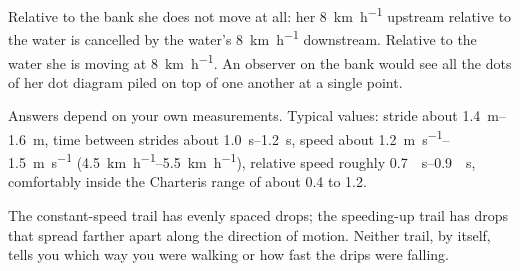 \documentclass[11pt,twoside,openany]{book}
\begin{document}
\begin{description}[leftmargin=2.6em,itemsep=3pt,style=sameline]
  \item[1.38] Relative to the bank she does not move at all: her \SI{8}{\kilo\metre\per\hour} upstream relative to the water is cancelled by the water's \SI{8}{\kilo\metre\per\hour} downstream. Relative to the water she is moving at \SI{8}{\kilo\metre\per\hour}. An observer on the bank would see all the dots of her dot diagram piled on top of one another at a single point.
  \item[1.39] Answers depend on your own measurements. Typical values: stride about \SIrange{1.4}{1.6}{\metre}, time between strides about \SIrange{1.0}{1.2}{\second}, speed about \SIrange{1.2}{1.5}{\metre\per\second} (\SIrange{4.5}{5.5}{\kilo\metre\per\hour}), relative speed roughly \SIrange{0.7}{0.9}{\per\second}, comfortably inside the Charteris range of about \num{0.4} to \num{1.2}.
  \item[1.40] The constant-speed trail has evenly spaced drops; the speeding-up trail has drops that spread farther apart along the direction of motion. Neither trail, by itself, tells you which way you were walking or how fast the drips were falling.
\end{description}
\end{document}

